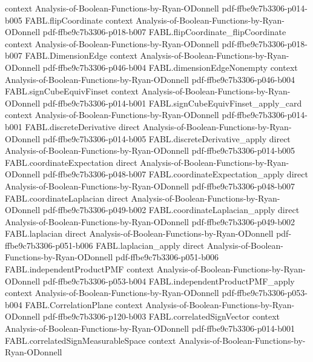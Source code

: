 \begin{theorem}
  {context}
  {Analysis-of-Boolean-Functions-by-Ryan-ODonnell}
  {pdf-ffbe9c7b3306-p014-b005}
\proofstep
  {FABL.flipCoordinate}
  {context}
  {Analysis-of-Boolean-Functions-by-Ryan-ODonnell}
  {pdf-ffbe9c7b3306-p018-b007}
\proofstep
  {FABL.flipCoordinate_flipCoordinate}
  {context}
  {Analysis-of-Boolean-Functions-by-Ryan-ODonnell}
  {pdf-ffbe9c7b3306-p018-b007}
\proofstep
  {FABL.DimensionEdge}
  {context}
  {Analysis-of-Boolean-Functions-by-Ryan-ODonnell}
  {pdf-ffbe9c7b3306-p046-b004}
\proofstep
  {FABL.dimensionEdgeNonempty}
  {context}
  {Analysis-of-Boolean-Functions-by-Ryan-ODonnell}
  {pdf-ffbe9c7b3306-p046-b004}
\proofstep
  {FABL.signCubeEquivFinset}
  {context}
  {Analysis-of-Boolean-Functions-by-Ryan-ODonnell}
  {pdf-ffbe9c7b3306-p014-b001}
\proofstep
  {FABL.signCubeEquivFinset_apply_card}
  {context}
  {Analysis-of-Boolean-Functions-by-Ryan-ODonnell}
  {pdf-ffbe9c7b3306-p014-b001}
\proofstep
  {FABL.discreteDerivative}
  {direct}
  {Analysis-of-Boolean-Functions-by-Ryan-ODonnell}
  {pdf-ffbe9c7b3306-p014-b005}
\proofstep
  {FABL.discreteDerivative_apply}
  {direct}
  {Analysis-of-Boolean-Functions-by-Ryan-ODonnell}
  {pdf-ffbe9c7b3306-p014-b005}
\proofstep
  {FABL.coordinateExpectation}
  {direct}
  {Analysis-of-Boolean-Functions-by-Ryan-ODonnell}
  {pdf-ffbe9c7b3306-p048-b007}
\proofstep
  {FABL.coordinateExpectation_apply}
  {direct}
  {Analysis-of-Boolean-Functions-by-Ryan-ODonnell}
  {pdf-ffbe9c7b3306-p048-b007}
\proofstep
  {FABL.coordinateLaplacian}
  {direct}
  {Analysis-of-Boolean-Functions-by-Ryan-ODonnell}
  {pdf-ffbe9c7b3306-p049-b002}
\proofstep
  {FABL.coordinateLaplacian_apply}
  {direct}
  {Analysis-of-Boolean-Functions-by-Ryan-ODonnell}
  {pdf-ffbe9c7b3306-p049-b002}
\proofstep
  {FABL.laplacian}
  {direct}
  {Analysis-of-Boolean-Functions-by-Ryan-ODonnell}
  {pdf-ffbe9c7b3306-p051-b006}
\proofstep
  {FABL.laplacian_apply}
  {direct}
  {Analysis-of-Boolean-Functions-by-Ryan-ODonnell}
  {pdf-ffbe9c7b3306-p051-b006}
\proofstep
  {FABL.independentProductPMF}
  {context}
  {Analysis-of-Boolean-Functions-by-Ryan-ODonnell}
  {pdf-ffbe9c7b3306-p053-b004}
\proofstep
  {FABL.independentProductPMF_apply}
  {context}
  {Analysis-of-Boolean-Functions-by-Ryan-ODonnell}
  {pdf-ffbe9c7b3306-p053-b004}
\proofstep
  {FABL.CorrelationPlane}
  {context}
  {Analysis-of-Boolean-Functions-by-Ryan-ODonnell}
  {pdf-ffbe9c7b3306-p120-b003}
\proofstep
  {FABL.correlatedSignVector}
  {context}
  {Analysis-of-Boolean-Functions-by-Ryan-ODonnell}
  {pdf-ffbe9c7b3306-p014-b001}
\proofstep
  {FABL.correlatedSignMeasurableSpace}
  {context}
  {Analysis-of-Boolean-Functions-by-Ryan-ODonnell}

\end{theorem}
